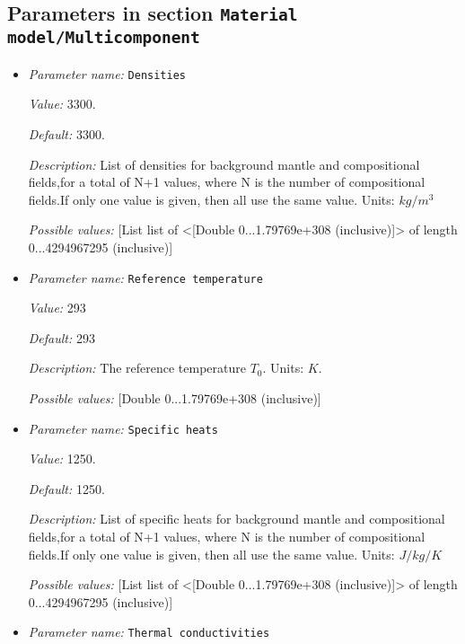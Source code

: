 \subsection{Parameters in section \tt Material model/Multicomponent}
\label{parameters:Material_20model/Multicomponent}

\begin{itemize}
\item {\it Parameter name:} {\tt Densities}
\label{parameters:Material model/Multicomponent/Densities}


{\it Value:} 3300.


{\it Default:} 3300.


{\it Description:} List of densities for background mantle and compositional fields,for a total of N+1 values, where N is the number of compositional fields.If only one value is given, then all use the same value.  Units: $kg / m^3$


{\it Possible values:} [List list of <[Double 0...1.79769e+308 (inclusive)]> of length 0...4294967295 (inclusive)]
\item {\it Parameter name:} {\tt Reference temperature}
\label{parameters:Material model/Multicomponent/Reference temperature}


{\it Value:} 293


{\it Default:} 293


{\it Description:} The reference temperature $T_0$. Units: $K$.


{\it Possible values:} [Double 0...1.79769e+308 (inclusive)]
\item {\it Parameter name:} {\tt Specific heats}
\label{parameters:Material model/Multicomponent/Specific heats}


{\it Value:} 1250.


{\it Default:} 1250.


{\it Description:} List of specific heats for background mantle and compositional fields,for a total of N+1 values, where N is the number of compositional fields.If only one value is given, then all use the same value. Units: $J /kg /K$


{\it Possible values:} [List list of <[Double 0...1.79769e+308 (inclusive)]> of length 0...4294967295 (inclusive)]
\item {\it Parameter name:} {\tt Thermal conductivities}
\label{parameters:Material model/Multicomponent/Thermal conductivities}



\end{itemize}

